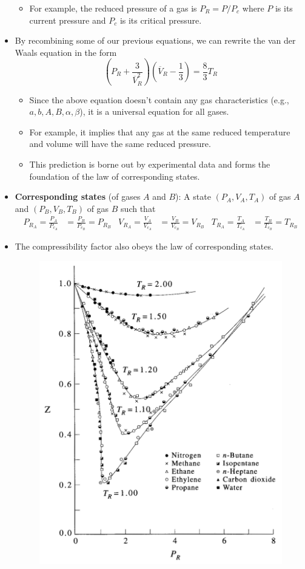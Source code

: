 \documentclass[../notes.tex]{subfiles}
\begin{document}
\begin{itemize}
    \begin{itemize}
        \item For example, the reduced pressure of a gas is $P_R=P/P_c$ where $P$ is its current pressure and $P_c$ is its critical pressure.
    \end{itemize}
    \item By recombining some of our previous equations, we can rewrite the van der Waals equation in the form
    \begin{equation*}
        \left( P_R+\frac{3}{\overline{V}_R^2} \right)\left( \overline{V}_R-\frac{1}{3} \right) = \frac{8}{3}T_R
    \end{equation*}
    \begin{itemize}
        \item Since the above equation doesn't contain any gas characteristics (e.g., $a,b,A,B,\alpha,\beta$), it is a universal equation for all gases.
        \item For example, it implies that any gas at the same reduced temperature and volume will have the same reduced pressure.
        \item This prediction is borne out by experimental data and forms the foundation of the law of corresponding states.
    \end{itemize}
    \item \textbf{Corresponding states} (of gases $A$ and $B$): A state $(P_A,V_A,T_A)$ of gas $A$ and $(P_B,V_B,T_B)$ of gas $B$ such that
    \begin{align*}
        P_{R_A} = \frac{P_A}{P_{c_A}} &= \frac{P_B}{P_{c_B}} = P_{R_B}&
        V_{R_A} = \frac{V_A}{V_{c_A}} &= \frac{V_B}{V_{c_B}} = V_{R_B}&
        T_{R_A} = \frac{T_A}{T_{c_A}} &= \frac{T_B}{T_{c_B}} = T_{R_B}
    \end{align*}
    \item The compressibility factor also obeys the law of corresponding states.
    \begin{figure}[h!]
        \centering
        \includegraphics[width=0.5\linewidth]{../ExtFiles/lawCorrespondingStates.png}

\end{figure}
\end{itemize}
\end{document}
